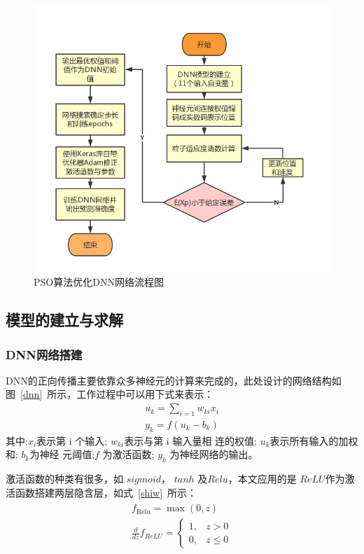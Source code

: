 \documentclass{whutmod}
\begin{document}
	\begin{figure}[H]
	\centering
	\includegraphics[width=\textwidth]{figures/21.png}
	\caption{PSO算法优化DNN网络流程图}\label{2222}
	\end{figure}


	\subsection{模型的建立与求解}
	
	\subsubsection{DNN网络搭建}
	DNN的正向传播主要依靠众多神经元的计算来完成的，此处设计的网络结构如图~\ref{dnn}~所示，工作过程中可以用下式来表示：
			\begin{gather}
{u_{k}=\sum_{i=1} w_{k i} x_{i}} \\ {y_{k}=f\left(u_{k}-b_{k}\right)}
	\end{gather}
	其中:$x_{i}$表示第 i 个输入; $w_{ki}$表示与第 i 输入量相 连的权值; $u_{k}$表示所有输入的加权和; $b_{k}$为神经 元阈值;$ f$ 为激活函数; $y_{k}$ 为神经网络的输出。
	
	激活函数的种类有很多，如 $sigmoid$， $tanh$ 及$ Relu$，本文应用的是 $ReLU$作为激活函数搭建两层隐含层，如式~\ref{shiw}~所示：
	\begin{gather}\label{shiw}
		\begin{array}{c}{f_{\text {Relu}}=\max (0, z)}\\
		\frac{d}{d z} f_{R e L U}=\left\{\begin{array}{ll}{1,} & {z>0} \\ {0,} & {z \leqslant 0}\end{array}\right.
		\end{array}
	\end{gather}
	
\end{document}
